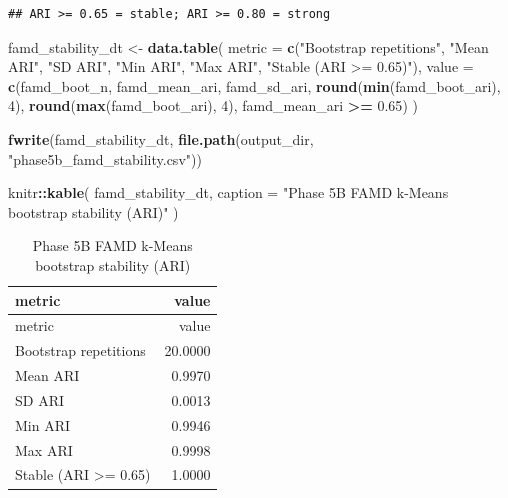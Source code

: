 \documentclass[
]{article}
\newenvironment{Shaded}{\begin{snugshade}}{\end{snugshade}}
\newcommand{\AttributeTok}[1]{\textcolor[rgb]{0.13,0.29,0.53}{#1}}
\newcommand{\DecValTok}[1]{\textcolor[rgb]{0.00,0.00,0.81}{#1}}
\newcommand{\FloatTok}[1]{\textcolor[rgb]{0.00,0.00,0.81}{#1}}
\newcommand{\FunctionTok}[1]{\textcolor[rgb]{0.13,0.29,0.53}{\textbf{#1}}}
\newcommand{\NormalTok}[1]{#1}
\newcommand{\OtherTok}[1]{\textcolor[rgb]{0.56,0.35,0.01}{#1}}
\newcommand{\SpecialCharTok}[1]{\textcolor[rgb]{0.81,0.36,0.00}{\textbf{#1}}}
\newcommand{\StringTok}[1]{\textcolor[rgb]{0.31,0.60,0.02}{#1}}
\begin{document}
\begin{verbatim}
## ARI >= 0.65 = stable; ARI >= 0.80 = strong
\end{verbatim}

\begin{Shaded}
\begin{Highlighting}[]
\NormalTok{famd\_stability\_dt }\OtherTok{\textless{}{-}} \FunctionTok{data.table}\NormalTok{(}
  \AttributeTok{metric =} \FunctionTok{c}\NormalTok{(}\StringTok{"Bootstrap repetitions"}\NormalTok{, }\StringTok{"Mean ARI"}\NormalTok{, }\StringTok{"SD ARI"}\NormalTok{,}
             \StringTok{"Min ARI"}\NormalTok{, }\StringTok{"Max ARI"}\NormalTok{, }\StringTok{"Stable (ARI \textgreater{}= 0.65)"}\NormalTok{),}
  \AttributeTok{value =} \FunctionTok{c}\NormalTok{(famd\_boot\_n, famd\_mean\_ari, famd\_sd\_ari,}
            \FunctionTok{round}\NormalTok{(}\FunctionTok{min}\NormalTok{(famd\_boot\_ari), }\DecValTok{4}\NormalTok{), }\FunctionTok{round}\NormalTok{(}\FunctionTok{max}\NormalTok{(famd\_boot\_ari), }\DecValTok{4}\NormalTok{),}
\NormalTok{            famd\_mean\_ari }\SpecialCharTok{\textgreater{}=} \FloatTok{0.65}\NormalTok{)}
\NormalTok{)}

\FunctionTok{fwrite}\NormalTok{(famd\_stability\_dt, }\FunctionTok{file.path}\NormalTok{(output\_dir, }\StringTok{"phase5b\_famd\_stability.csv"}\NormalTok{))}

\NormalTok{knitr}\SpecialCharTok{::}\FunctionTok{kable}\NormalTok{(}
\NormalTok{  famd\_stability\_dt,}
  \AttributeTok{caption =} \StringTok{"Phase 5B FAMD k{-}Means bootstrap stability (ARI)"}
\NormalTok{)}
\end{Highlighting}
\end{Shaded}

\begin{longtable}[]{@{}lr@{}}
\caption{Phase 5B FAMD k-Means bootstrap stability (ARI)}\tabularnewline
\toprule\noalign{}
metric & value \\
\midrule\noalign{}
\endfirsthead
\toprule\noalign{}
metric & value \\
\midrule\noalign{}
\endhead
\bottomrule\noalign{}
\endlastfoot
Bootstrap repetitions & 20.0000 \\
Mean ARI & 0.9970 \\
SD ARI & 0.0013 \\
Min ARI & 0.9946 \\
Max ARI & 0.9998 \\
Stable (ARI \textgreater= 0.65) & 1.0000 \\
\end{longtable}
\end{document}
